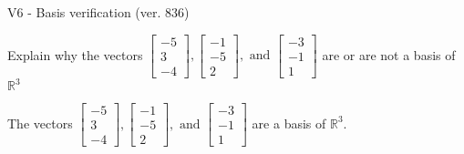 \begin{exercise}
  \begin{exerciseTitle}V6 - Basis verification (ver. 836)\end{exerciseTitle}
  \begin{exerciseStatement}
    Explain why the vectors \(\left[\begin{array}{r}
-5 \\
3 \\
-4
\end{array}\right] , \left[\begin{array}{r}
-1 \\
-5 \\
2
\end{array}\right] , \text{ and } \left[\begin{array}{r}
-3 \\
-1 \\
1
\end{array}\right]\) are or are not a basis of \(\mathbb{R}^3\)	


  \end{exerciseStatement}
  \begin{exerciseAnswer}
   The vectors \(\left[\begin{array}{r}
-5 \\
3 \\
-4
\end{array}\right] , \left[\begin{array}{r}
-1 \\
-5 \\
2
\end{array}\right] , \text{ and } \left[\begin{array}{r}
-3 \\
-1 \\
1
\end{array}\right]\) 
  	 are  a basis of \(\mathbb{R}^3\).
  


  \end{exerciseAnswer}
\end{exercise}
